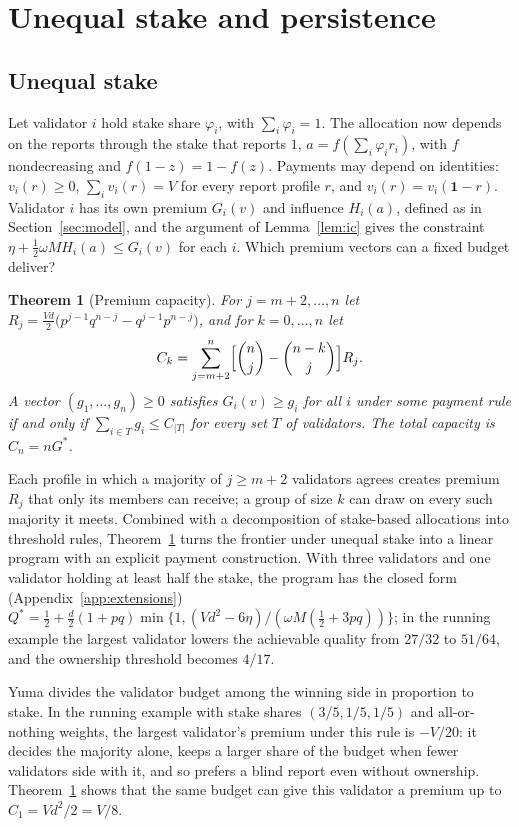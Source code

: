 \documentclass[sigconf,anonymous,review]{acmart}
\numberwithin{equation}{section}
\newtheorem{theorem}{Theorem}[section]
\newcommand{\Gs}{G^{*}}
\begin{document}
\section{Unequal stake and persistence}
\label{sec:extensions}

\subsection{Unequal stake}

Let validator $i$ hold stake share $\varphi_i$, with $\sum_i\varphi_i=1$. The
allocation now depends on the reports through the stake that reports $1$,
$a=f(\sum_i\varphi_ir_i)$, with $f$ nondecreasing and $f(1-z)=1-f(z)$. Payments
may depend on identities: $v_i(r)\ge0$, $\sum_iv_i(r)=V$ for every report
profile $r$, and $v_i(r)=v_i(\mathbf 1-r)$. Validator $i$ has its own premium
$G_i(v)$ and influence $H_i(a)$, defined as in Section~\ref{sec:model}, and the
argument of Lemma~\ref{lem:ic} gives the constraint
$\eta+\frac12\omega MH_i(a)\le G_i(v)$ for each $i$. Which premium vectors can
a fixed budget deliver?

\begin{theorem}[Premium capacity]\label{thm:capacity}
For $j=m+2,\dots,n$ let
$R_j=\frac{Vd}{2}\bigl(p^{j-1}q^{n-j}-q^{j-1}p^{n-j}\bigr)$, and for
$k=0,\dots,n$ let
\[
C_k=\sum_{j=m+2}^{n}\Bigl[\binom nj-\binom{n-k}{j}\Bigr]R_j .
\]
A vector $(g_1,\dots,g_n)\ge0$ satisfies $G_i(v)\ge g_i$ for all $i$ under
some payment rule if and only if $\sum_{i\in T}g_i\le C_{|T|}$ for every set
$T$ of validators. The total capacity is $C_n=n\Gs$.
\end{theorem}

Each profile in which a majority of $j\ge m+2$ validators agrees creates
premium $R_j$ that only its members can receive; a group of size $k$ can draw
on every such majority it meets. Combined with a decomposition of stake-based
allocations into threshold rules, Theorem~\ref{thm:capacity} turns the frontier
under unequal stake into a linear program with an explicit payment
construction. With three validators and one validator holding at least half the
stake, the program has the closed form (Appendix~\ref{app:extensions})
$Q^*=\frac12+\frac d2(1+pq)\min\{1,(Vd^2-6\eta)/(\omega M(\frac12+3pq))\}$; in
the running example the largest validator lowers the achievable quality from
$27/32$ to $51/64$, and the ownership threshold becomes $4/17$.

Yuma divides the validator budget among the winning side in proportion to
stake. In the running example with stake shares $(3/5,1/5,1/5)$ and all-or-nothing
weights, the largest validator's premium under this rule is $-V/20$: it decides
the majority alone, keeps a larger share of the budget when fewer validators
side with it, and so prefers a blind report even without ownership.
Theorem~\ref{thm:capacity} shows that the same budget can give this validator a
premium up to $C_1=Vd^2/2=V/8$.
\end{document}
